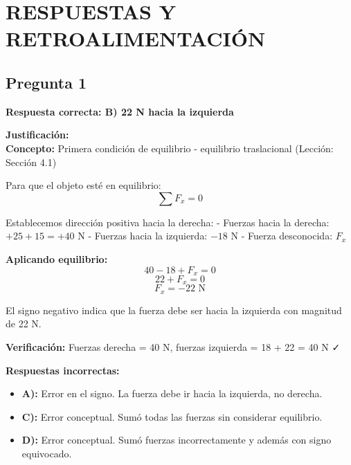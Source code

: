 \newpage
\onecolumn
\section{RESPUESTAS Y RETROALIMENTACIÓN}

\begin{respuestabox}
\subsection{Pregunta 1}
\textcolor{verdecorrecto}{\textbf{Respuesta correcta: B) 22 N hacia la izquierda}}

\textbf{Justificación:}\\
\textbf{Concepto:} Primera condición de equilibrio - equilibrio traslacional (Lección: Sección 4.1)

Para que el objeto esté en equilibrio:
$$\sum F_x = 0$$

Establecemos dirección positiva hacia la derecha:
- Fuerzas hacia la derecha: $+25 + 15 = +40$ N
- Fuerzas hacia la izquierda: $-18$ N
- Fuerza desconocida: $F_x$

\textbf{Aplicando equilibrio:}
$$40 - 18 + F_x = 0$$
$$22 + F_x = 0$$
$$F_x = -22 \text{ N}$$

El signo negativo indica que la fuerza debe ser hacia la izquierda con magnitud de 22 N.

\textbf{Verificación:} Fuerzas derecha = 40 N, fuerzas izquierda = 18 + 22 = 40 N ✓

\textbf{Respuestas incorrectas:}
\begin{itemize}
    \item \textbf{A):} Error en el signo. La fuerza debe ir hacia la izquierda, no derecha.
    \item \textbf{C):} Error conceptual. Sumó todas las fuerzas sin considerar equilibrio.
    \item \textbf{D):} Error conceptual. Sumó fuerzas incorrectamente y además con signo equivocado.
\end{itemize}
\end{respuestabox}


